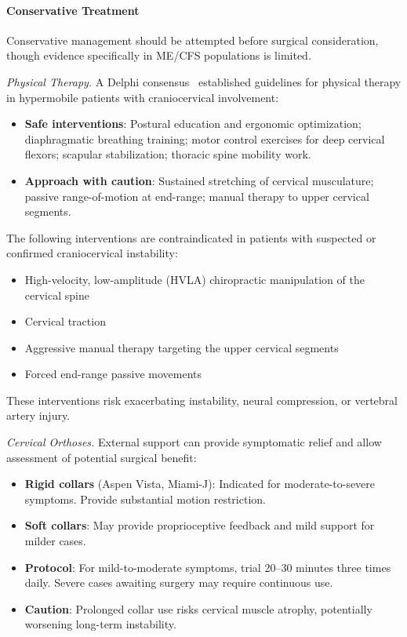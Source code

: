 \paragraph{Conservative Treatment}

Conservative management should be attempted before surgical consideration, though evidence specifically in ME/CFS populations is limited.

\textit{Physical Therapy.} A Delphi consensus~\cite{Russek2023} established guidelines for physical therapy in hypermobile patients with craniocervical involvement:

\begin{itemize}
    \item \textbf{Safe interventions}: Postural education and ergonomic optimization; diaphragmatic breathing training; motor control exercises for deep cervical flexors; scapular stabilization; thoracic spine mobility work.
    \item \textbf{Approach with caution}: Sustained stretching of cervical musculature; passive range-of-motion at end-range; manual therapy to upper cervical segments.
\end{itemize}

\begin{warning}
\label{warn:cci-contraindications}
The following interventions are contraindicated in patients with suspected or confirmed craniocervical instability:
\begin{itemize}
    \item High-velocity, low-amplitude (HVLA) chiropractic manipulation of the cervical spine
    \item Cervical traction
    \item Aggressive manual therapy targeting the upper cervical segments
    \item Forced end-range passive movements
\end{itemize}
These interventions risk exacerbating instability, neural compression, or vertebral artery injury.
\end{warning}

\textit{Cervical Orthoses.} External support can provide symptomatic relief and allow assessment of potential surgical benefit:

\begin{itemize}
    \item \textbf{Rigid collars} (Aspen Vista, Miami-J): Indicated for moderate-to-severe symptoms. Provide substantial motion restriction.
    \item \textbf{Soft collars}: May provide proprioceptive feedback and mild support for milder cases.
    \item \textbf{Protocol}: For mild-to-moderate symptoms, trial 20--30 minutes three times daily. Severe cases awaiting surgery may require continuous use.
    \item \textbf{Caution}: Prolonged collar use risks cervical muscle atrophy, potentially worsening long-term instability.
\end{itemize}

